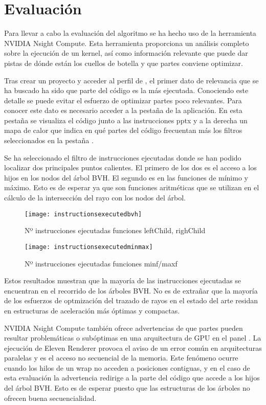 \chapter{Evaluación}
\label{chap:evaluation}

Para llevar a cabo la evaluación del algoritmo se ha hecho uso de la herramienta NVIDIA Nsight Compute. Esta herramienta proporciona un análisis completo sobre la ejecución de un kernel, así como información relevante que puede dar pistas de dónde están los cuellos de botella y que partes conviene optimizar.

Tras crear un proyecto y acceder al perfil de , el primer dato de relevancia que se ha buscado ha sido que parte del código es la más ejecutada. Conociendo este detalle se puede evitar el esfuerzo de optimizar partes poco relevantes. Para conocer este dato es necesario acceder a la pestaña  de la aplicación. En esta pestaña se visualiza el código junto a las instrucciones pptx y a la derecha un mapa de calor que indica en qué partes del código frecuentan más los filtros seleccionados en la pestaña .

Se ha seleccionado el filtro de instrucciones ejecutadas donde se han podido localizar dos principales puntos calientes. El primero de los dos es el acceso a los hijos en los nodos del árbol BVH. El segundo es en las funciones de mínimo y máximo. Esto es de esperar ya que son funciones aritméticas que se utilizan en el cálculo de la intersección del rayo con los nodos del árbol.

\begin{figure}[H]
    \centering
	\texttt{[image: instructionsexecutedbvh]}
	\caption{Nº instrucciones ejecutadas funciones leftChild, righChild}
	\label{fig:label}
\end{figure}

\begin{figure}[H]
    \centering
	\texttt{[image: instructionsexecutedminmax]}
	\caption{Nº instrucciones ejecutadas funciones minf/maxf}
	\label{fig:label}
\end{figure}

Estos resultados muestran que la mayoría de las instrucciones ejecutadas se encuentran en el recorrido de los árboles BVH. No es de extrañar que la mayoría de los esfuerzos de optmización del trazado de rayos en el estado del arte residan en estructuras de aceleración más óptimas y compactas. 

NVIDIA Nsight Compute también ofrece advertencias de que partes pueden resultar problemáticas o subóptimas en una arquitectura de GPU en el panel . La ejecución de Eleven Renderer provoca el aviso de un error común en arquitecturas paralelas y es el acceso no secuencial de la memoria. Este fenómeno ocurre cuando los hilos de un wrap no acceden a posiciones contiguas, y en el caso de esta evaluación la advertencia redirige a la parte del código que accede a los hijos del árbol BVH. Esto es de esperar puesto que las estructuras de los árboles no ofrecen buena secuencialidad.

